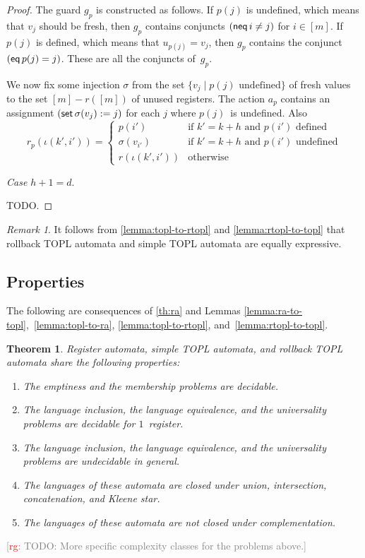 \documentclass[9pt, preprint]{sigplanconf} %
\newcommand{\noterg}[2]{\textcolor{gray}{[\textcolor{red}{#1}: #2]}}
\newcommand{\rg}[1]{\noterg{rg}{#1}}
\newtheorem{theorem}{Theorem}
\theoremstyle{definition}
\theoremstyle{remark}
\newtheorem{remark}{Remark}
\begin{document}
\begin{proof}
The guard $g_p$ is constructed as follows.
If $p(j)$ is undefined, which means that $v_j$ should be fresh, then $g_p$ contains conjuncts $({\sf neq}\,i\ne j)$ for $i\in[m]$.
If $p(j)$ is defined, which means that $u_{p(j)}=v_j$, then $g_p$ contains the conjunct $({\sf eq}\,p(j)=j)$.
These are all the conjuncts of~$g_p$.

We now fix some injection $\sigma$ from the set $\{v_j\mid\text{$p(j)$ undefined}\}$ of fresh values to the set $[m]-r([m])$ of unused registers.
The action $a_p$ contains an assignment $({\sf set}\,\sigma(v_j):=j)$ for each $j$ where $p(j)$~is undefined.
Also
\[ r_p(\iota(k',i')) = \begin{cases}
  p(i')  & \text{if $k'=k+h$ and $p(i')$ defined} \\
  \sigma(v_{i'}) & \text{if $k'=k+h$ and $p(i')$ undefined} \\
  r(\iota(k',i')) &\text{otherwise}
\end{cases}\]


{\it Case $h+1=d$}.
\smallskip

TODO\null.
\end{proof}

\begin{remark}
It follows from \autoref{lemma:topl-to-rtopl} and \autoref{lemma:rtopl-to-topl} that rollback TOPL automata and simple TOPL automata are equally expressive.
\end{remark}

\subsection{Properties} %

The following are consequences of \autoref{th:ra} and Lemmas \ref{lemma:ra-to-topl},~\ref{lemma:topl-to-ra}, \ref{lemma:topl-to-rtopl}, and~\ref{lemma:rtopl-to-topl}.

\begin{theorem}\label{th:main}
Register automata, simple TOPL automata, and rollback TOPL automata share the following properties:
\begin{enumerate}
\item The emptiness and the membership problems are decidable.
\item The language inclusion, the language equivalence, and the universality problems are decidable for $1$~register.
\item The language inclusion, the language equivalence, and the universality problems are undecidable in general.
\item The languages of these automata are closed under union, intersection, concatenation, and Kleene star.
\item The languages of these automata are not closed under complementation.
\end{enumerate}
\end{theorem}
\rg{TODO: More specific complexity classes for the problems above.}
\end{document}
